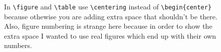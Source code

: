 \documentclass[watermark]{pbpreprint}
\begin{document}
\begin{figure}
\hfill
{}
\caption{In \texttt{\textbackslash figure} and \texttt{\textbackslash table} use \texttt{\textbackslash centering} instead of \texttt{\textbackslash begin\{center\}} because othewise you are adding extra space that shouldn't be there. Also, figure numbering is strange here because in order to show the extra space I wanted to use real figures which end up with their own numbers.}
\end{figure}
\end{document}
